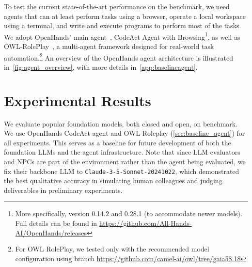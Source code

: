 \documentclass{article}
\begin{document}
To test the current state-of-the-art performance on the \tac benchmark, we need agents that can at least perform tasks using a browser, operate a local workspace using a terminal, and write and execute programs to perform most of the tasks.
We adopt OpenHands' main agent~\citep{wang2024openhandsopenplatformai,wang2024executable,song2024beyond}, CodeAct Agent with Browsing\footnote{More specifically, version 0.14.2 and 0.28.1 (to accommodate newer models). Full details can be found in \url{https://github.com/All-Hands-AI/OpenHands/releases}}, as well as OWL-RolePlay~\citep{owl2025}, a multi-agent framework designed for real-world task automation.\footnote{For OWL RolePlay, we tested only with the recommended model configuration using branch \url{https://github.com/camel-ai/owl/tree/gaia58.18}}
%
An overview of the OpenHands agent architecture is illustrated in~\autoref{fig:agent_overview}, with more details in~\autoref{app:baselineagent}.

\section{Experimental Results}
\label{sec:results}
We evaluate popular foundation models, both closed and open, on \tac benchmark.
We use OpenHands CodeAct agent and OWL-Roleplay (\autoref{sec:baseline_agent}) for all experiments.
This serves as a baseline for future development of both the foundation LLMs and the agent infrastructure.
Note that since LLM evaluators and NPCs are part of the environment rather than the agent being evaluated, we fix their backbone LLM to \texttt{Claude-3-5-Sonnet-20241022}, which demonstrated the best qualitative accuracy in simulating human colleagues and judging deliverables in preliminary experiments. 
\end{document}
